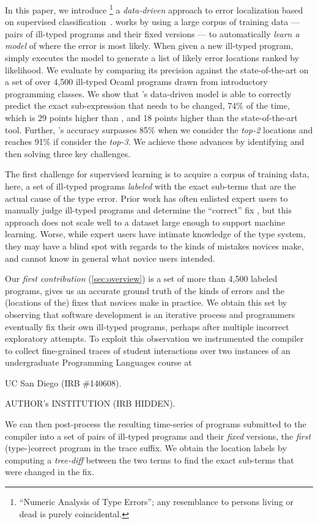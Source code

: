 %
In this paper, we introduce \toolname
\footnote{``Numeric Analysis of Type Errors''; any resemblance to persons living or dead is purely coincidental.}
a \emph{data-driven} approach to error
localization based on supervised
classification~\citep{Kotsiantis2007-pj}.
%
\toolname works by using a large corpus
of training data --- pairs of ill-typed
programs and their fixed versions ---
to automatically \emph{learn a model}
of where the error is most likely.
%
When given a new ill-typed program,
\toolname simply executes the model
to generate a list of likely error
locations ranked by likelihood.
%
We evaluate \toolname by comparing its
precision against the state-of-the-art
on a set of over 4,500 ill-typed Ocaml
programs drawn from introductory
programming classes.
%
We show that \toolname's data-driven
model is able to correctly predict
the exact sub-expression that needs to
be changed, 74\% of the time, which is
29 points higher than \ocaml, and
18 points higher than the state-of-the-art
\sherrloc tool.
%
Further, \toolname's accuracy surpasses
85\% when we consider the \emph{top-2}
locations and reaches 91\% if consider
the \emph{top-3}.
%
We achieve these advances by identifying
and then solving three key challenges.

%
The first challenge for supervised learning
is to acquire a corpus of training data, here,
a set of ill-typed programs \emph{labeled}
with the exact sub-terms that are the actual
cause of the type error.
%
Prior work has often enlisted expert users
to manually judge ill-typed programs and
determine the ``correct'' fix \citep[\eg][]{Loncaric2016-uk},
but this approach does not scale well to
a dataset large enough to support machine
learning.
%
Worse, while expert users have intimate
knowledge of the type system, they may
have a blind spot with regards to the
kinds of mistakes novices make, and
cannot know in general what novice users
intended.

Our \emph{first contribution} (\autoref{sec:overview})
is a set of more than 4,500 labeled programs,
gives us an accurate ground truth of
the kinds of errors and the (locations
of the) fixes that novices make in
practice.
%
We obtain this set by observing that
software development is an iterative
process and programmers eventually
fix their own ill-typed programs,
perhaps after multiple incorrect
exploratory attempts.
%
To exploit this observation we instrumented
the \ocaml compiler to collect fine-grained
traces of student interactions over two instances
of an undergraduate Programming Languages course at
%
\begin{anonsuppress}
UC San Diego (IRB \#140608).
\end{anonsuppress}
\begin{noanonsuppress}
AUTHOR's INSTITUTION (IRB HIDDEN).
\end{noanonsuppress}
%
We can then post-process the resulting time-series
of programs submitted to the \ocaml compiler into
a set of pairs of ill-typed programs and their
\emph{fixed} versions, the \emph{first} (type-)correct
program in the trace suffix.
%
We obtain the location labels by computing a
\emph{tree-diff} between the two terms to find
the exact sub-terms that were changed in the fix.

